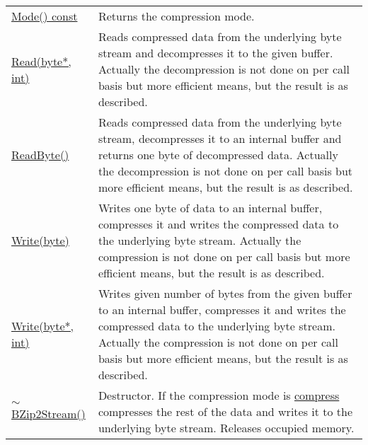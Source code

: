 \documentclass[a4paper,oneside,11.000000pt]{book}
\begin{document}
\begin{flushleft}
\begin{supertabular}[l]{!{\raggedright}p{7.575cm}!{\raggedright}p{7.575cm}}
\\
\hyperlink{System.IO.Compression.BZip2Stream.Mode.C.P.System.IO.Compression.BZip2Stream}{Mode() const}
& Returns the compression mode.

\\
\hyperlink{System.IO.Compression.BZip2Stream.Read.P.System.IO.Compression.BZip2Stream.P.byte.int}{Read(byte*, int)}
& Reads compressed data from the underlying byte stream and decompresses it to the given buffer.
Actually the decompression is not done on per call basis but more efficient means, but
the result is as described.

\\
\hyperlink{System.IO.Compression.BZip2Stream.ReadByte.P.System.IO.Compression.BZip2Stream}{ReadByte()}
& Reads compressed data from the underlying byte stream, decompresses it to an internal buffer
and returns one byte of decompressed data.
Actually the decompression is not done on per call basis but more efficient means, but
the result is as described.

\\
\hyperlink{System.IO.Compression.BZip2Stream.Write.P.System.IO.Compression.BZip2Stream.byte}{Write(byte)}
& Writes one byte of data to an internal buffer, compresses it and writes the compressed data
to the underlying byte stream.
Actually the compression is not done on per call basis but more efficient means, but
the result is as described.

\\
\hyperlink{System.IO.Compression.BZip2Stream.Write.P.System.IO.Compression.BZip2Stream.P.byte.int}{Write(byte*, int)}
& Writes given number of bytes from the given buffer to an internal buffer,
compresses it and writes the compressed data to the underlying byte stream.
Actually the compression is not done on per call basis but more efficient means, but
the result is as described.

\\
\hyperlink{System.IO.Compression.BZip2Stream.destructor.P.System.IO.Compression.BZip2Stream}{$\sim$BZip2Stream()}
& Destructor. If the compression mode is \hyperlink{System.IO.Compression.CompressionMode.compress}{compress} compresses the rest of the data
and writes it to the underlying byte stream. Releases occupied memory.

\\
\end{supertabular}

\end{flushleft}
\clearpage
\end{document}
